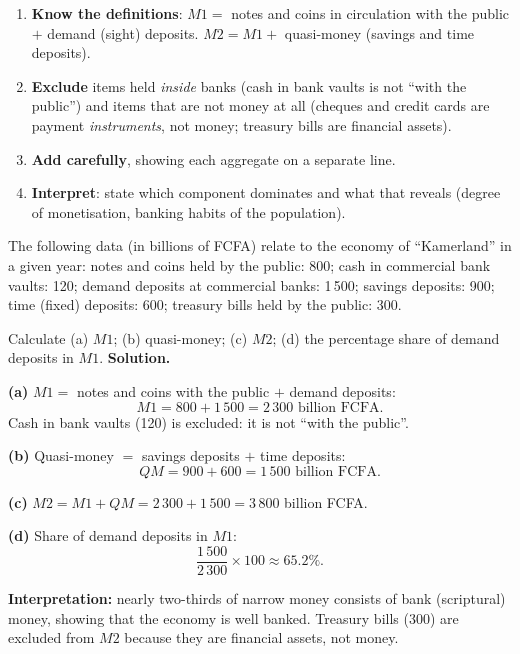 \documentclass[11pt]{article}
\begin{document}
\begin{methode}
\begin{enumerate}
\item \textbf{Know the definitions}: $M1 =$ notes and coins in circulation with the public $+$ demand (sight) deposits. $M2 = M1 +$ quasi-money (savings and time deposits).
\item \textbf{Exclude} items held \emph{inside} banks (cash in bank vaults is not ``with the public'') and items that are not money at all (cheques and credit cards are payment \emph{instruments}, not money; treasury bills are financial assets).
\item \textbf{Add carefully}, showing each aggregate on a separate line.
\item \textbf{Interpret}: state which component dominates and what that reveals (degree of monetisation, banking habits of the population).
\end{enumerate}
\end{methode}

\begin{exoresolu}
The following data (in billions of FCFA) relate to the economy of ``Kamerland'' in a given year: notes and coins held by the public: 800; cash in commercial bank vaults: 120; demand deposits at commercial banks: 1\,500; savings deposits: 900; time (fixed) deposits: 600; treasury bills held by the public: 300.

Calculate (a) $M1$; (b) quasi-money; (c) $M2$; (d) the percentage share of demand deposits in $M1$.
\tcblower
\textbf{Solution.}

\textbf{(a)} $M1 =$ notes and coins with the public $+$ demand deposits:
\[ M1 = 800 + 1\,500 = 2\,300 \text{ billion FCFA.} \]
Cash in bank vaults (120) is excluded: it is not ``with the public''.

\textbf{(b)} Quasi-money $=$ savings deposits $+$ time deposits:
\[ QM = 900 + 600 = 1\,500 \text{ billion FCFA.} \]

\textbf{(c)} $M2 = M1 + QM = 2\,300 + 1\,500 = 3\,800$ billion FCFA.

\textbf{(d)} Share of demand deposits in $M1$:
\[ \frac{1\,500}{2\,300}\times 100 \approx 65.2\%. \]

\textbf{Interpretation:} nearly two-thirds of narrow money consists of bank (scriptural) money, showing that the economy is well banked. Treasury bills (300) are excluded from $M2$ because they are financial assets, not money.
\end{exoresolu}
\end{document}
